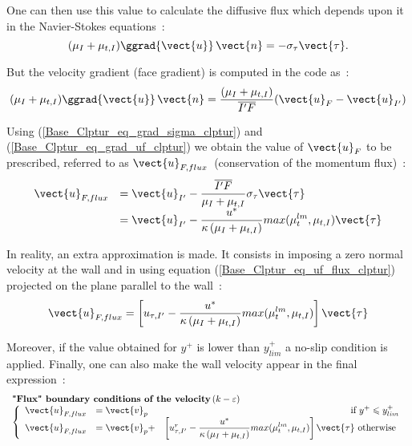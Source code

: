 One can then use this value to calculate the diffusive flux 
which depends upon it in the Navier-Stokes equations~:
\begin{equation}\label{Base_Clptur_eq_grad_sigma_clptur}
(\mu_I+\mu_{t,I})\ggrad{\vect{u}}\,\vect{n}=-\sigma_\tau \vect{\tau}.
\end{equation}

But the velocity gradient (face gradient) is computed in the code as~:
\begin{equation}\label{Base_Clptur_eq_grad_uf_clptur}
(\mu_I+\mu_{t,I})\ggrad{\vect{u}}\,\vect{n}=
\displaystyle\frac{(\mu_I+\mu_{t,I})}{\overline{I'F}}(\vect{u}_F-\vect{u}_{I'})
\end{equation}

Using (\ref{Base_Clptur_eq_grad_sigma_clptur}) and 
(\ref{Base_Clptur_eq_grad_uf_clptur}) we obtain the value of $\vect{u}_F$ 
to be prescribed, referred to as $\vect{u}_{F,flux}$~(conservation of the momentum flux)~:
\begin{equation}\label{Base_Clptur_eq_uf_flux_clptur}
\begin{array}{ll}
\vect{u}_{F,flux}&=\vect{u}_{I'}-\displaystyle\frac{\overline{I'F}}{\mu_I+\mu_{t,I}}\sigma_\tau \vect{\tau}\\
                 &=\vect{u}_{I'}-\displaystyle\frac{u^*}{\kappa\, (\mu_I+\mu_{t,I})} max(\mu_{t}^{lm},\mu_{t,I}) \vect{\tau}
\end{array}
\end{equation}

In reality, an extra approximation is made. It consists in imposing a zero
 normal velocity at the wall and in using equation (\ref{Base_Clptur_eq_uf_flux_clptur})
 projected on the plane parallel to the wall~:
\begin{equation}
\vect{u}_{F,flux}=\left[u_{\tau,I'}-\displaystyle\frac{u^*}{\kappa\,
(\mu_I+\mu_{t,I})} max(\mu_{t}^{lm},\mu_{t,I}) \right]\vect{\tau}
\end{equation}

Moreover, if the value obtained for $y^+$ is
lower than  $y^+_{lim}$ a no-slip condition is applied.
Finally, one can also make the wall velocity appear in the final expression~: 
\begin{equation}
\begin{array}{l}
\text{\bf "Flux" boundary conditions of the velocity}\,(k-\varepsilon)\\
\left\{\begin{array}{llr}
\vect{u}_{F,flux}&=\vect{v}_p& \text{ if\ }  y^+\leqslant
                           y^+_{lim} \\
\vect{u}_{F,flux}&=\vect{v}_p+&\left[u^r_{\tau,I'}-\displaystyle\frac{u^*}{\kappa\,
(\mu_I+\mu_{t,I})} max(\mu_{t}^{lm},\mu_{t,I}) \right]\vect{\tau}
\text{ otherwise }
\end{array}\right.
\end{array}
\end{equation}

